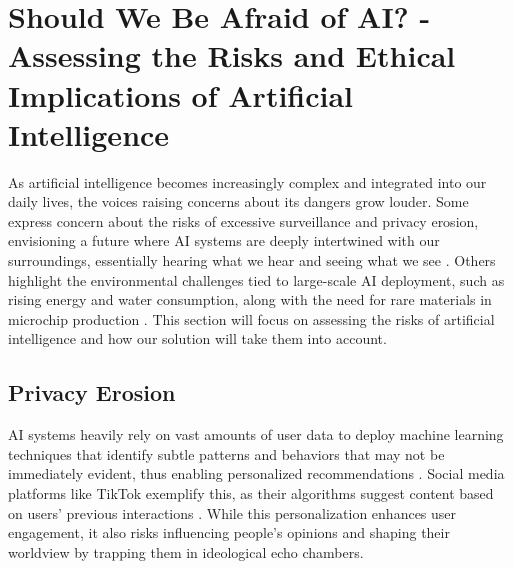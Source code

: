 \documentclass[licencjacka,en]{pracamgr}
\begin{document}


\section{Should We Be Afraid of AI? - Assessing the Risks and Ethical Implications of Artificial Intelligence}


As artificial intelligence becomes increasingly complex and integrated into our daily lives, the voices raising concerns about its dangers grow louder. Some express concern about the risks of excessive surveillance and privacy erosion, envisioning a future where AI systems are deeply intertwined with our surroundings, essentially hearing what we hear and seeing what we see \cite{not_sroka_vid} \cite{ai_scare2} \cite{ai_scare3}. Others highlight the environmental challenges tied to large-scale AI deployment, such as rising energy and water consumption, along with the need for rare materials in microchip production \cite{ai_env_concerns}. This section will focus on assessing the risks of artificial intelligence and how our solution will take them into account.

\subsection{Privacy Erosion}
AI systems heavily rely on vast amounts of user data to deploy machine learning techniques that identify subtle patterns and behaviors that may not be immediately evident, thus enabling personalized recommendations \cite{data_guard}. Social media platforms like TikTok exemplify this, as their algorithms suggest content based on users' previous interactions \cite{it_convergence} \cite{builtin}. While this personalization enhances user engagement, it also risks influencing people's opinions and shaping their worldview by trapping them in ideological echo chambers\cite{echo_chambers}.
\end{document}
